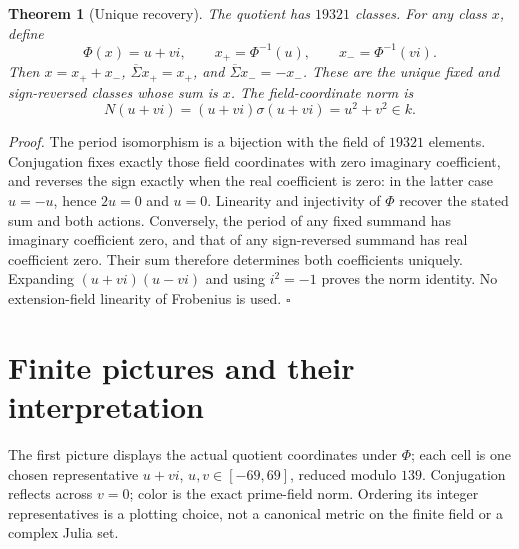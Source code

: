 \documentclass[11pt,letterpaper]{article}
\newtheorem{theorem}{Theorem}
\newenvironment{proof}{\noindent\textit{Proof.}}{\hfill\(\square\)}
\begin{document}
\begin{center}
\end{center}

\begin{theorem}[Unique recovery]
The quotient has \(19321\) classes. For any class \(x\), define
\[
\Phi(x)=u+vi,\qquad x_+=\Phi^{-1}(u),\qquad x_-=\Phi^{-1}(vi).
\]
Then \(x=x_++x_-\), \(\overline\Sigma x_+=x_+\), and
\(\overline\Sigma x_-=-x_-\). These are the unique fixed and sign-reversed
classes whose sum is \(x\). The field-coordinate norm is
\[
N(u+vi)=(u+vi)\sigma(u+vi)=u^2+v^2\in k.
\]
\end{theorem}
\begin{proof}
The period isomorphism is a bijection with the field of \(19321\) elements.
Conjugation fixes exactly those field coordinates with zero imaginary
coefficient, and reverses the sign exactly when the real coefficient is zero:
in the latter case \(u=-u\), hence \(2u=0\) and \(u=0\).
Linearity and injectivity of \(\Phi\) recover the stated sum and both actions.
Conversely, the period of any fixed summand has imaginary coefficient zero,
and that of any sign-reversed summand has real coefficient zero. Their sum
therefore determines both coefficients uniquely. Expanding
\((u+vi)(u-vi)\) and using \(i^2=-1\) proves the norm identity.
No extension-field linearity of Frobenius is used.
\end{proof}

\section{Finite pictures and their interpretation}

The first picture displays the actual quotient coordinates under \(\Phi\);
each cell is one chosen representative \(u+vi\), \(u,v\in[-69,69]\), reduced
modulo \(139\). Conjugation reflects across \(v=0\); color is the exact
prime-field norm. Ordering its integer representatives is a plotting choice,
not a canonical metric on the finite field or a complex Julia set.
\end{document}
